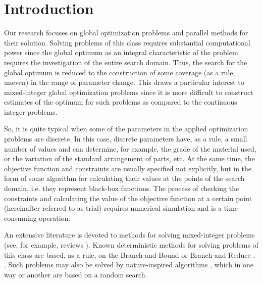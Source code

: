 \documentclass[
11pt,%
tightenlines,%
twoside,%
onecolumn,%
nofloats,%
nobibnotes,%
nofootinbib,%
superscriptaddress,%
noshowpacs,%
centertags]%
{revtex4}
\begin{document}

\maketitle


\section{Introduction}

Our research focuses on global optimization problems and parallel methods for their solution. Solving problems of this class requires substantial computational power since the global optimum as an integral characteristic of the problem requires the investigation of the entire search domain. Thus, the search for the global optimum is reduced to the construction of some coverage (as a rule, uneven) in the range of parameter change. This draws a particular interest to mixed-integer global optimization problems since it is more difficult to construct estimates of the optimum for such problems as compared to the continuous integer problems. 

So, it is quite typical when some of the parameters in the applied optimization problems are discrete. In this case, discrete parameters have, as a rule, a small number of values and can determine, for example, the grade of the material used, or the variation of the standard arrangement of parts, etc.
At the same time, the objective function and constraints are usually specified not explicitly, but in the form of some algorithm for calculating their values at the points of the search domain, i.e. they represent black-box functions. The process of checking the constraints and calculating the value of the objective function at a certain point (hereinafter referred to as trial) requires numerical simulation and is a time-consuming operation. 

An extensive literature is devoted to methods for solving mixed-integer problems (see, for example, reviews \cite{Burer,Boukouvala}). Known deterministic methods for solving problems of this class are based, as a rule, on the Branch-and-Bound \cite{Belotti} or Branch-and-Reduce \cite{Vigerske}. . Such problems may also be solved by nature-inspired algorithms \cite{Deep,Schluter}, which in one way or another are based on a random search.
\end{document}
